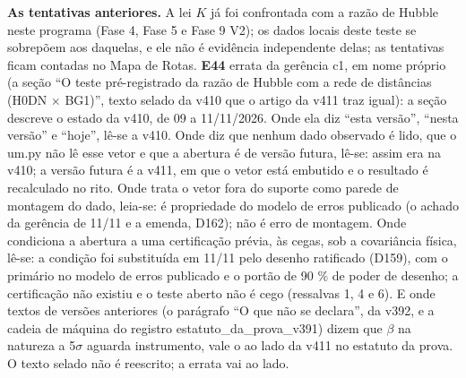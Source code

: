 \textbf{As tentativas anteriores.} A lei $K$ já foi confrontada com a razão de Hubble neste programa (Fase 4, Fase 5 e Fase 9 V2); os dados locais deste teste se sobrepõem aos daquelas, e ele não é evidência independente delas; as tentativas ficam contadas no Mapa de Rotas.
\textbf{E44} errata da gerência c1, em nome próprio (a seção “O teste pré-registrado da razão de Hubble com a rede de distâncias (H0DN $\times$ BG1)”, texto selado da v410 que o artigo da v411 traz igual): a seção descreve o estado da v410, de 09 a 11/11/2026. Onde ela diz “esta versão”, “nesta versão” e “hoje”, lê-se a v410. Onde diz que nenhum dado observado é lido, que o um.py não lê esse vetor e que a abertura é de versão futura, lê-se: assim era na v410; a versão futura é a v411, em que o vetor está embutido e o resultado é recalculado no rito. Onde trata o vetor fora do suporte como parede de montagem do dado, leia-se: é propriedade do modelo de erros publicado (o achado da gerência de 11/11 e a emenda, D162); não é erro de montagem. Onde condiciona a abertura a uma certificação prévia, às cegas, sob a covariância física, lê-se: a condição foi substituída em 11/11 pelo desenho ratificado (D159), com o primário no modelo de erros publicado e o portão de 90 \% de poder de desenho; a certificação não existiu e o teste aberto não é cego (ressalvas 1, 4 e 6). E onde textos de versões anteriores (o parágrafo “O que não se declara”, da v392, e a cadeia de máquina do registro estatuto\_da\_prova\_v391) dizem que $\beta$ na natureza a 5$\sigma$ aguarda instrumento, vale o ao lado da v411 no estatuto da prova. O texto selado não é reescrito; a errata vai ao lado.
